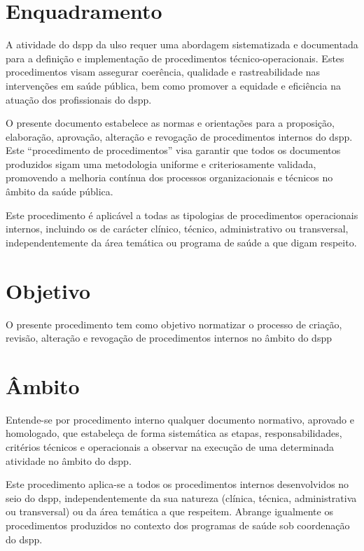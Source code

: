 \section{Enquadramento}\label{sec:enquadramento}

A atividade do \gls{dspp} da \gls{ulso} requer uma abordagem sistematizada e documentada para a definição e implementação de procedimentos técnico-operacionais. Estes procedimentos visam assegurar coerência, qualidade e rastreabilidade nas intervenções em saúde pública, bem como promover a equidade e eficiência na atuação dos profissionais do \gls{dspp}.

O presente documento estabelece as normas e orientações para a proposição, elaboração, aprovação, alteração e revogação de procedimentos internos do \gls{dspp}. Este “procedimento de procedimentos” visa garantir que todos os documentos produzidos sigam uma metodologia uniforme e criteriosamente validada, promovendo a melhoria contínua dos processos organizacionais e técnicos no âmbito da saúde pública.

Este procedimento é aplicável a todas as tipologias de procedimentos operacionais internos, incluindo os de carácter clínico, técnico, administrativo ou transversal, independentemente da área temática ou programa de saúde a que digam respeito.


\section{Objetivo}\label{sec:objetivo}

O presente procedimento tem como objetivo normatizar o processo de criação, revisão, alteração e revogação de procedimentos internos no âmbito do \gls{dspp}


\section{Âmbito}\label{sec:ambito}

Entende-se por procedimento interno qualquer documento normativo, aprovado e homologado, que estabeleça de forma sistemática as etapas, responsabilidades, critérios técnicos e operacionais a observar na execução de uma determinada atividade no âmbito do \gls{dspp}.

Este procedimento aplica-se a todos os procedimentos internos desenvolvidos no seio do \gls{dspp}, independentemente da sua natureza (clínica, técnica, administrativa ou transversal) ou da área temática a que respeitem. Abrange igualmente os procedimentos produzidos no contexto dos programas de saúde sob coordenação do \gls{dspp}.

